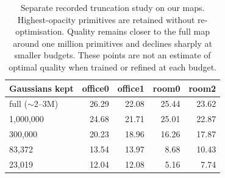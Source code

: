 \begin{table}[t]
\centering\small
\setlength{\tabcolsep}{4pt}
\begin{tabular}{@{}lrrrr@{}}
\toprule
Gaussians kept & office0 & office1 & room0 & room2 \\
\midrule
full ($\sim$2--3M)     & 26.29 & 22.08 & 25.44 & 23.62 \\
1{,}000{,}000          & 24.68 & 21.71 & 25.01 & 22.87 \\
300{,}000              & 20.23 & 18.96 & 16.26 & 17.87 \\
83{,}372               & 13.54 & 13.97 & \phantom{0}8.68 & 10.43 \\
23{,}019               & 12.04 & 12.08 & \phantom{0}5.16 & \phantom{0}7.74 \\
\bottomrule
\end{tabular}
\caption[PSNR versus map budget, four Replica scenes]{Separate recorded
truncation study on our maps. Highest-opacity primitives are retained
without re-optimisation. Quality remains closer to the full map around one
million primitives and declines sharply at smaller budgets. These points
are not an estimate of optimal quality when trained or refined at each budget.}
\label{tab:curve}
\end{table}
